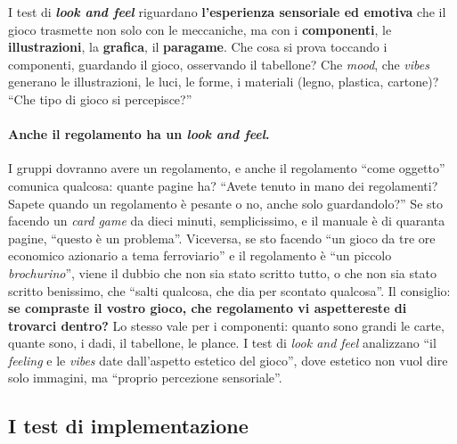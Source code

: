 I test di \textbf{\emph{look and feel}} riguardano \textbf{l'esperienza sensoriale ed
emotiva} che il gioco trasmette non solo con le meccaniche, ma con i
\textbf{componenti}, le \textbf{illustrazioni}, la \textbf{grafica}, il
\textbf{paragame}. Che cosa si prova toccando i componenti, guardando il gioco,
osservando il tabellone? Che \emph{mood}, che \emph{vibes} generano le illustrazioni, le
luci, le forme, i materiali (legno, plastica, cartone)? ``Che tipo di gioco si
percepisce?''

\paragraph{Anche il regolamento ha un \emph{look and feel}.} I gruppi dovranno avere un
regolamento, e anche il regolamento ``come oggetto'' comunica qualcosa: quante pagine
ha? ``Avete tenuto in mano dei regolamenti? Sapete quando un regolamento è pesante o no,
anche solo guardandolo?'' Se sto facendo un \emph{card game} da dieci minuti,
semplicissimo, e il manuale è di quaranta pagine, ``questo è un problema''. Viceversa, se
sto facendo ``un gioco da tre ore economico azionario a tema ferroviario'' e il
regolamento è ``un piccolo \emph{brochurino}'', viene il dubbio che non sia stato scritto
tutto, o che non sia stato scritto benissimo, che ``salti qualcosa, che dia per scontato
qualcosa''. Il consiglio: \textbf{se compraste il vostro gioco, che regolamento vi
aspettereste di trovarci dentro?} Lo stesso vale per i componenti: quanto sono grandi le
carte, quante sono, i dadi, il tabellone, le plance. I test di \emph{look and feel}
analizzano ``il \emph{feeling} e le \emph{vibes} date dall'aspetto estetico del gioco'',
dove estetico non vuol dire solo immagini, ma ``proprio percezione sensoriale''.

\subsection{I test di implementazione}

